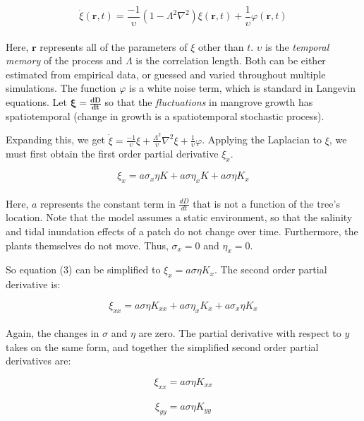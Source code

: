 \begin{equation}
\dot{\xi}(\boldsymbol{r},t) = \frac{-1}{\upsilon}(1 - \Lambda^2\nabla^2) \xi(\boldsymbol{r},t) + \frac{1}{\upsilon}\varphi(\boldsymbol{r},t)
\end{equation}\\

Here, $\boldsymbol{r}$ represents all of the parameters of $\xi$ other than $t$. $\upsilon$ is the \textit{temporal memory} of the process and $\Lambda$ is the correlation length. Both can be either estimated from empirical data, or guessed and varied throughout multiple simulations. The function $\varphi$ is a white noise term, which is standard in Langevin equations. Let $\boldsymbol{\xi = \frac{dD}{dt}}$ so that the \textit{fluctuations} in mangrove growth has spatiotemporal (change in growth is a spatiotemporal stochastic process).

Expanding this, we get $\dot{\xi} = \frac{-1}{\upsilon}\xi + \frac{\Lambda^2}{\upsilon}\nabla^2\xi + \frac{1}{\upsilon}\varphi$. Applying the Laplacian to $\xi$, we must first obtain the first order partial derivative $\xi_x$.

\begin{equation}
\xi_x = a\sigma_x\eta K + a\sigma\eta_x K + a\sigma\eta K_x
\end{equation}\\

Here, $a$ represents the constant term in $\frac{dD}{dt}$ that is not a function of the tree's location. Note that the model assumes a static environment, so that the salinity and tidal inundation effects of a patch do not change over time. Furthermore, the plants themselves do not move. Thus, $\sigma_x = 0$ and $\eta_x = 0$.

So equation (3) can be simplified to $\xi_x = a\sigma\eta K_x$. The second order partial derivative is:

\begin{equation}
\xi_{xx} = a\sigma\eta K_{xx} + a\sigma\eta_x K_x + a\sigma_x\eta K_x
\end{equation}\\

Again, the changes in $\sigma$ and $\eta$ are zero. The partial derivative with respect to $y$ takes on the same form, and together the simplified second order partial derivatives are:

\begin{equation}
\xi_{xx} = a\sigma\eta K_{xx}
\end{equation}\\
\begin{equation}
\xi_{yy} = a\sigma\eta K_{yy}
\end{equation}\\


